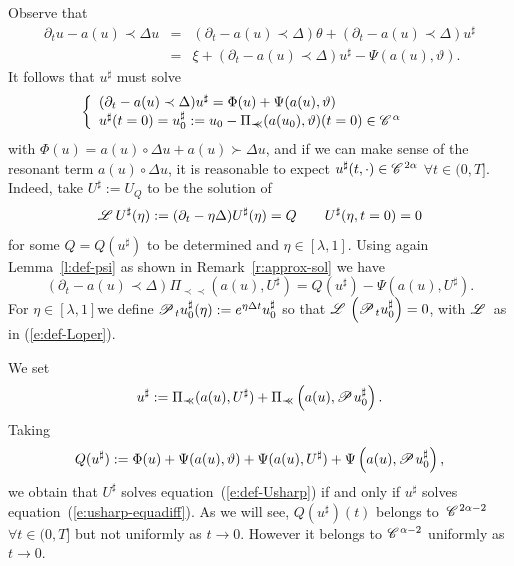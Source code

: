 \documentclass{amsart}
\newcommand{\assign}{:=}
\newcommand{\cdummy}{\cdot}
\newcommand{\precprec}{\prec\!\!\!\prec}
\theoremstyle{remark}
\theoremstyle{definition}
\newcommand{\CC}{\mathscr{C} \hspace{.1em}}
\newcommand{\LL}{\mathscr{L} \hspace{.2em}}
\newcommand{\PP}{\mathscr{P} \hspace{.1em}}
\begin{document}
Observe that
\begin{eqnarray*}
  \partial_t u - a (u) \prec \Delta u & = & (\partial_t - a (u) \prec \Delta)
  \theta + (\partial_t - a (u) \prec \Delta) u^{\sharp}\\
  & = & \xi + (\partial_t - a (u) \prec \Delta) u^{\sharp} - \Psi (a (u),
  \vartheta) .
\end{eqnarray*}
It follows that $u^{\sharp}$ must solve
\begin{equation}
  \left\{ \begin{array}{l}
    (\partial_t - a (u) \prec \Delta) u^{\sharp} = \Phi (u) + \Psi (a (u),
    \vartheta)\\
    u^{\sharp} (t = 0) = u^{\sharp}_0 \assign u_0 - \Pi_{\precprec} (a (u_0),
    \vartheta) (t = 0) \in \CC^{\alpha}
  \end{array} \right. \label{e:usharp-equadiff} \qquad
\end{equation}
with $\Phi (u) = a (u) \circ \Delta u + a (u) \succ \Delta u$, and if we can
make sense of the resonant term $a (u) \circ \Delta u$, it is reasonable to
expect $u^{\sharp} (t, \cdummy) \in \CC^{2 \alpha}$ $\forall t \in (0, T]$.
Indeed, take $U^{\sharp} \assign U_Q$ to be the solution of
\begin{equation}
  \LL U^{\sharp} (\eta) \assign (\partial_t - \eta \Delta) U^{\sharp} (\eta) =
  Q \qquad U^{\sharp} (\eta, t = 0) = 0 \label{e:def-Usharp} 
\end{equation}
for some $Q = Q (u^{\sharp})$ to be determined and $\eta \in [\lambda, 1]$.
Using again Lemma~\ref{l:def-psi} as shown in Remark~\ref{r:approx-sol} we
have
\[ (\partial_t - a (u) \prec \Delta) \Pi_{\precprec} (a (u), U^{\sharp}) = Q
   (u^{\sharp}) - \Psi (a (u), U^{\sharp}) . \]
For $\eta \in [\lambda, 1] $we define $\PP_t u_0^{\sharp} (\eta) \assign
e^{\eta \Delta t} u_0^{\sharp}$ so that $\LL \left( \PP_t u_0^{\sharp} \right)
= 0$, with $\LL$ as in (\ref{e:def-Loper}).

We set
\begin{equation}
  u^{\sharp} \assign \Pi_{\precprec} (a (u), U^{\sharp}) + \Pi_{\precprec}
  \left( a (u), \PP u_0^{\sharp} \right) . \label{eq:decomp-sharp}
\end{equation}
Taking
\[ Q (u^{\sharp}) : = \Phi (u) + \Psi (a (u), \vartheta) + \Psi (a (u),
   U^{\sharp}) + \Psi \left( a (u), \PP u_0^{\sharp} \right), \]
we obtain that $U^{\sharp}$ solves equation~(\ref{e:def-Usharp}) if and only
if $u^{\sharp}$ solves equation~(\ref{e:usharp-equadiff}). As we will see, $Q
(u^{\sharp}) (t)$ belongs to~$\CC^{2 \alpha - 2}$ $\forall t \in (0, T]$ but
not uniformly as $t \rightarrow 0$. However it belongs to $\CC^{\alpha - 2}$
uniformly as $t \rightarrow 0$.
\end{document}
